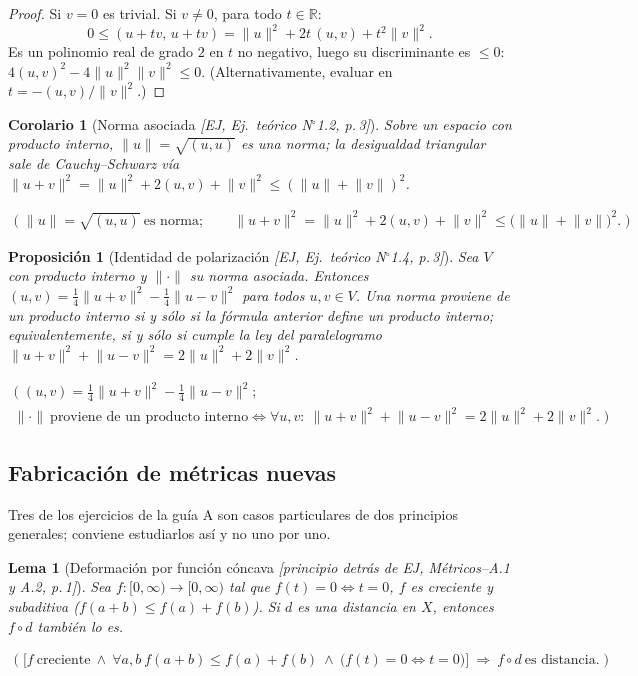 \documentclass[11pt,a4paper]{article}
\newcommand{\lgc}[1]{\par\vspace{-3pt}\begin{gather*}\big(\;#1\;\big)\end{gather*}\vspace{-6pt}}
\theoremstyle{definition}
\theoremstyle{plain}
\newtheorem{proposicion}[definicion]{Proposición}
\newtheorem{lema}[definicion]{Lema}
\newtheorem{corolario}[definicion]{Corolario}
\newcommand{\fnt}[1]{{\normalfont\small\itshape\color{gray!150!black}[#1]}}
\newcommand{\R}{\mathbb{R}}
\newcommand{\norm}[1]{\lVert #1 \rVert}
\begin{document}
\begin{proof}
Si $v=0$ es trivial. Si $v\ne 0$, para todo $t\in\R$:
\[
0\le (u+tv,\,u+tv)=\norm{u}^2+2t\,(u,v)+t^2\norm{v}^2 .
\]
Es un polinomio real de grado $2$ en $t$ no negativo, luego su discriminante es $\le 0$:
$4(u,v)^2-4\norm{u}^2\norm{v}^2\le 0$. (Alternativamente, evaluar en $t=-(u,v)/\norm{v}^2$.)
\end{proof}

\begin{corolario}[Norma asociada \fnt{EJ, Ej.\ teórico N$^\circ$1.2, p.\,3}]
Sobre un espacio con producto interno, $\norm{u}=\sqrt{(u,u)}$ es una norma; la desigualdad triangular sale de Cauchy--Schwarz vía
$\norm{u+v}^2=\norm{u}^2+2(u,v)+\norm{v}^2\le(\norm{u}+\norm{v})^2$.
\lgc{\norm{u}=\sqrt{(u,u)}\ \text{es norma};\qquad
\norm{u+v}^2=\norm{u}^2+2(u,v)+\norm{v}^2\le\big(\norm{u}+\norm{v}\big)^2.}
\end{corolario}


\begin{proposicion}[Identidad de polarización \fnt{EJ, Ej.\ teórico N$^\circ$1.4, p.\,3}]
Sea $V$ con producto interno y $\norm{\cdot}$ su norma asociada. Entonces $(u,v)=\tfrac14\norm{u+v}^2-\tfrac14\norm{u-v}^2$ para todos $u,v\in V$. Una norma proviene de un producto interno si y sólo si la fórmula anterior define un producto interno; equivalentemente, si y sólo si cumple la \emph{ley del paralelogramo}
$\norm{u+v}^2+\norm{u-v}^2=2\norm{u}^2+2\norm{v}^2$.
\lgc{(u,v)=\tfrac14\norm{u+v}^2-\tfrac14\norm{u-v}^2;\\
\norm{\cdot}\ \text{proviene de un producto interno}\iff \forall u,v:\ \norm{u+v}^2+\norm{u-v}^2=2\norm{u}^2+2\norm{v}^2.}
\end{proposicion}


\subsection{Fabricación de métricas nuevas}

Tres de los ejercicios de la guía A son casos particulares de dos principios generales; conviene estudiarlos así y no uno por uno.

\begin{lema}[Deformación por función cóncava \fnt{principio detrás de EJ, Métricos--A.1 y A.2, p.\,1}]
Sea $f:[0,\infty)\to[0,\infty)$ tal que $f(t)=0\iff t=0$, $f$ es creciente y \emph{subaditiva} ($f(a+b)\le f(a)+f(b)$). Si $d$ es una distancia en $X$, entonces $f\circ d$ también lo es.
\lgc{\Big[f\ \text{creciente}\ \wedge\ \forall a,b\ f(a+b)\le f(a)+f(b)\ \wedge\ \big(f(t)=0\Leftrightarrow t=0\big)\Big]\ \Rightarrow\ f\circ d\ \text{es distancia}.}
\end{lema}
\end{document}
